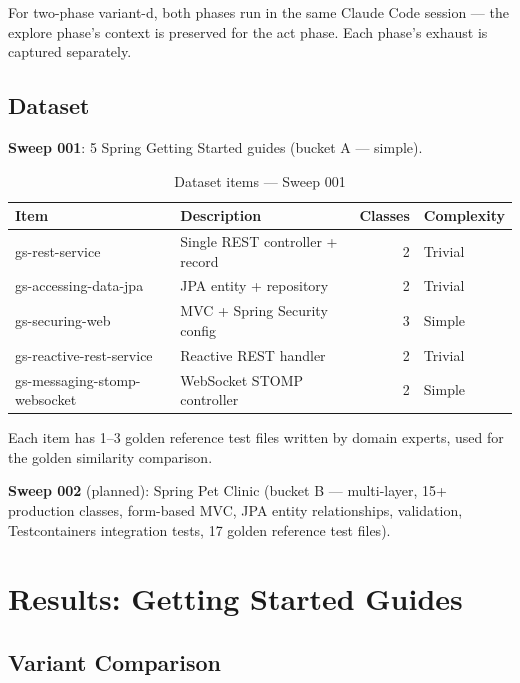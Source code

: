 \documentclass[11pt,a4paper]{article}
\begin{document}
For two-phase variant-d, both phases run in the same Claude Code session ---
the explore phase's context is preserved for the act phase. Each phase's
exhaust is captured separately.

\subsection{Dataset}

\textbf{Sweep 001}: 5 Spring Getting Started guides (bucket A --- simple).

\begin{table}[H]
\centering
\caption{Dataset items --- Sweep 001}
\label{tab:dataset}
\small
\begin{tabular}{@{}llrl@{}}
\toprule
\textbf{Item} & \textbf{Description} & \textbf{Classes} & \textbf{Complexity} \\
\midrule
gs-rest-service            & Single REST controller + record     & 2  & Trivial \\
gs-accessing-data-jpa      & JPA entity + repository             & 2  & Trivial \\
gs-securing-web            & MVC + Spring Security config        & 3  & Simple \\
gs-reactive-rest-service   & Reactive REST handler               & 2  & Trivial \\
gs-messaging-stomp-websocket & WebSocket STOMP controller        & 2  & Simple \\
\bottomrule
\end{tabular}
\end{table}

Each item has 1--3 golden reference test files written by domain experts,
used for the golden similarity comparison.

\textbf{Sweep 002} (planned): Spring Pet Clinic (bucket B --- multi-layer,
15+ production classes, form-based MVC, JPA entity relationships, validation,
Testcontainers integration tests, 17 golden reference test files).

\section{Results: Getting Started Guides}

\subsection{Variant Comparison}
\end{document}
